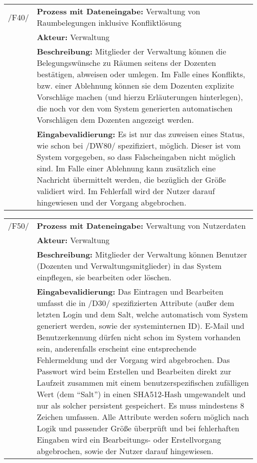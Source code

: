\begin{tabular}{p{1.5cm}p{14.5cm}}
		
	 /F40/ & \textbf{Prozess mit Dateneingabe:} Verwaltung von Raumbelegungen inklusive Konfliktlösung \\
				& \textbf{Akteur:} Verwaltung \\
				& \textbf{Beschreibung:} Mitglieder der Verwaltung können die Belegungswünsche zu Räumen seitens der Dozenten bestätigen, abweisen oder umlegen. Im Falle eines Konflikts, bzw. einer Ablehnung können sie dem Dozenten explizite Vorschläge machen (und hierzu Erläuterungen hinterlegen), die noch vor den vom System generierten automatischen Vorschlägen dem Dozenten angezeigt werden. \\
				& \textbf{Eingabevalidierung:} Es ist nur das zuweisen eines Status, wie schon bei /DW80/ spezifiziert, möglich. Dieser ist vom System vorgegeben, so dass Falscheingaben nicht möglich sind. Im Falle einer Ablehnung kann zusätzlich eine Nachricht übermittelt werden, die bezüglich der Größe validiert wird. Im Fehlerfall wird der Nutzer darauf hingewiesen und der Vorgang abgebrochen.\\[0.25cm]

\end{tabular}


\begin{tabular}{p{1.5cm}p{14.5cm}}
	
	 /F50/	& \textbf{Prozess mit Dateneingabe:} Verwaltung von Nutzerdaten \\
				& \textbf{Akteur:} Verwaltung \\
				& \textbf{Beschreibung:} Mitglieder der Verwaltung können Benutzer (Dozenten und Verwaltungsmitglieder) in das System einpflegen, sie bearbeiten oder löschen. \\
				& \textbf{Eingabevalidierung:} Das Eintragen und Bearbeiten umfasst die in /D30/ spezifizierten Attribute (außer dem letzten Login und dem Salt, welche automatisch vom System generiert werden, sowie der systeminternen ID). E-Mail und Benutzerkennung dürfen nicht schon im System vorhanden sein, anderenfalls erscheint eine entsprechende Fehlermeldung und der Vorgang wird abgebrochen. Das Passwort wird beim Erstellen und Bearbeiten direkt zur Laufzeit zusammen mit einem benutzerspezifischen zufälligen Wert (dem "`Salt"') in einen SHA512-Hash umgewandelt und nur als solcher persistent gespeichert. Es muss mindestens 8 Zeichen umfassen. Alle Attribute werden sofern möglich nach Logik und passender Größe überprüft und bei fehlerhaften Eingaben wird ein Bearbeitungs- oder Erstellvorgang abgebrochen, sowie der Nutzer darauf hingewiesen.\\[0.25cm]

\end{tabular}


